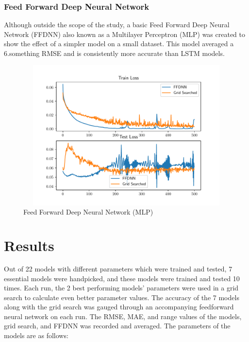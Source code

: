 \documentclass[10pt,11pt,12pt,oneside]{book}
\begin{document}
\subsubsection{Feed Forward Deep Neural Network}
Although outside the scope of the study, a basic Feed Forward Deep Neural Network (FFDNN) also known as a Multilayer Perceptron (MLP) was created to show the effect of a simpler model on a small dataset. This model averaged a 6.something RMSE and is consistently more accurate than LSTM models. \\
\begin{figure}[H]
\centering
\includegraphics[width=5in,height=3in]{Data/ffdnn.pdf}
\caption{Feed Forward Deep Neural Network (MLP)}
\label{fig:mlp}
\end{figure}
\section{Results}
Out of 22 models with different parameters which were trained and tested, 7 essential models were handpicked, and these models were trained and tested 10 times. Each run, the 2 best performing models’ parameters were used in a grid search to calculate even better parameter values. The accuracy of the 7 models along with the grid search was gauged through an accompanying feedforward neural network on each run. The RMSE, MAE, and range values of the models, grid search, and FFDNN was recorded and averaged. The parameters of the models are as follows:
\end{document}
